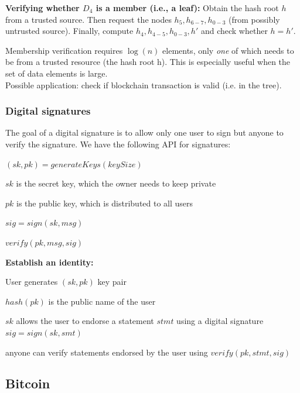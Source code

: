 \documentclass[11pt,oneside,a4paper]{article}
\begin{document}
\textbf{Verifying whether $D_4$ is a member (i.e., a leaf):} Obtain the hash root $h$ from a trusted source. Then request the nodes $h_5, h_{6-7}, h_{0-3}$ (from possibly untrusted source). Finally, compute $h_4, h_{4-5}, h_{0-3}, h'$ and check whether $h = h'$.

Membership verification requires $\log(n)$ elements, only \textit{one} of which needs to be from a trusted resource (the hash root h). This is especially useful when the set of data elements is large.\\
Possible application: check if blockchain transaction is valid (i.e. in the tree).

\subsubsection{Digital signatures}

The goal of a digital signature is to allow only one user to sign but anyone to verify the signature. We have the following API for signatures:

\begin{compactitem}
	\item $(sk,pk) = generateKeys(keySize)$
	\begin{compactitem}
		\item $sk$ is the secret key, which the owner needs to keep private
		\item $pk$ is the public key, which is distributed to all users
	\end{compactitem}
	\item $sig = sign(sk, msg)$
	\item $verify(pk, msg, sig)$
\end{compactitem}

\textbf{Establish an identity:}

\begin{compactitem}
	\item User generates $(sk,pk)$ key pair
	\item $hash(pk)$ is the public name of the user
	\item $sk$ allows the user to endorse a statement $stmt$ using a digital signature $sig = sign(sk, smt)$
	\item anyone can verify statements endorsed by the user using $verify(pk, stmt, sig)$
\end{compactitem}

\subsection{Bitcoin}
\end{document}
